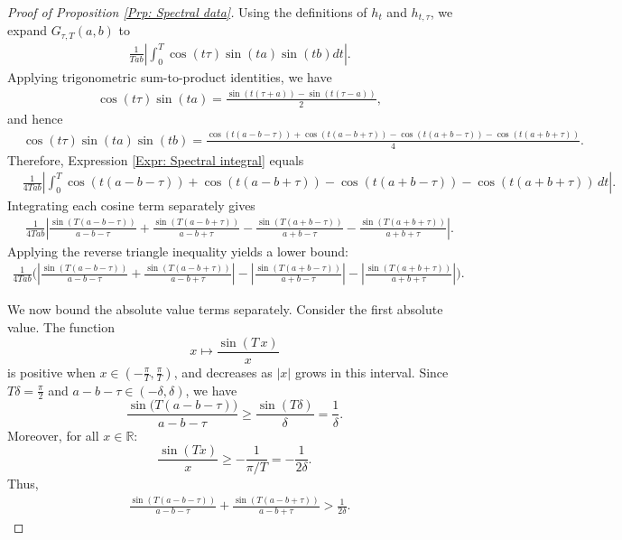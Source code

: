 \documentclass[11pt,twoside,reqno]{amsart} \usepackage{a4wide} \usepackage[T1]{fontenc} \usepackage[utf8]{inputenc} \usepackage{soul}  \usepackage{amsmath} \usepackage{amsfonts} \usepackage{amssymb} \usepackage{mathtools} \usepackage{amsthm} \usepackage{xcolor} \usepackage{graphicx} \usepackage{hyperref} \usepackage{standalone} \usepackage{esint} \usepackage{comment} \usepackage[left=2.3cm,top=3cm,right=2.3cm]{geometry} \usepackage{bm} \usepackage{svg} \usepackage{float} \numberwithin{equation}{section} \theoremstyle{plain} \newtheorem{thm}{Theorem}[section] \newtheorem{theorem}[thm]{Theorem} \newtheorem*{theorem*}{Theorem}\newtheorem{conj}[thm]{Conjecture} \newtheorem{lemma}[thm]{Lemma} \newtheorem{prop}[thm]{Proposition} \newtheorem{proposition}[thm]{Proposition} \newtheorem{cor}[thm]{Corollary} \newtheorem{question}[thm]{Question} \newtheorem{corollary}[thm]{Corollary} \newtheorem{assumption}[thm]{Assumption} \theoremstyle{definition} \newtheorem{defn}[thm]{Definition} \newtheorem{choice}[thm]{Choice} \newtheorem{definition}[thm]{Definition} \newtheorem{ex}[thm]{Example} \newtheorem{notation}[thm]{Notation} \newtheorem*{ack}{Acknowledgements} \theoremstyle{remark} \newtheorem{remark}[thm]{Remark} \newtheorem{bigremark}[thm]{Remark} \usepackage{xcolor} \newcommand{\red}[1]{ {\color{Red}#1} } \newcommand{\blue}[1]{ {\color{Blue}#1} } \author{Kai Hippi} \address{Aalto University, Espoo, Finland} \email{kai.hippi@aalto.fi}
\begin{document}
\begin{proof}[Proof of Proposition \ref{Prp: Spectral data}]
Using the definitions of $h_{t}$ and $h_{t,\tau}$, we expand $G_{\tau, T}(a,b)$ to
\begin{align}
	&
	\label{Expr: Spectral integral}
	 \frac{1}{T a b} \left| \int_{0}^{T} \cos( t \tau ) \sin( t a ) \sin( t b ) dt \right|.
\end{align}
Applying trigonometric sum-to-product identities, we have
\begin{align*}
	&
	\cos( t \tau ) \sin( t a ) = \frac{ \sin\left( t( \tau + a ) \right) - \sin \left( t (  \tau - a ) \right) }{2},
\end{align*}
and hence
\begin{align*}
	&
	\cos( t \tau ) \sin( t a ) \sin( t b ) =
	\frac{  \cos(t ( a - b - \tau ) ) + \cos( t( a - b + \tau ) ) - \cos( t( a + b - \tau ) ) - \cos( t( a + b + \tau ) ) }{4}.
\end{align*}
Therefore, Expression \eqref{Expr: Spectral integral} equals
\begin{align*}
	&
	\frac{1}{4 T a b} \left| \int_{0}^{T} \cos(t ( a - b - \tau ) ) + \cos( t( a - b + \tau ) ) - \cos( t( a + b - \tau ) ) - \cos( t( a + b + \tau ) ) \, dt \right|.
\end{align*}
Integrating each cosine term separately gives
\begin{align*}
	&
	\frac{1}{4 T a b} \left| \frac{ \sin( T( a - b - \tau ) ) }{ a - b - \tau } + \frac{ \sin( T( a - b + \tau ) ) }{a - b + \tau} - \frac{ \sin( T( a + b - \tau ) ) }{a + b - \tau} - \frac{ \sin( T( a + b + \tau ) ) }{a + b + \tau} \right|.
\end{align*}
Applying the reverse triangle inequality yields a lower bound:
\begin{align}
	\label{Expr: Reverse triangle}
\frac{1}{4Tab} \bigg(
\left| \frac{\sin(T(a - b - \tau))}{a - b - \tau}
     + \frac{\sin(T(a - b + \tau))}{a - b + \tau} \right|
-
\left| \frac{\sin(T(a + b - \tau))}{a + b - \tau} \right|
-
\left| \frac{\sin(T(a + b + \tau))}{a + b + \tau} \right|
\bigg).
\end{align}

We now bound the absolute value terms separately. Consider the first absolute value. The function
$$x \mapsto \frac{ \sin( T \, x ) }{x}$$ 
is positive when $ x \in  \left(- \frac{\pi}{T} , \frac{\pi}{T} \right)$, and decreases as $|x|$ grows in this interval. Since $T\delta = \frac{\pi}{2}$ and $a - b - \tau \in (-\delta,\delta)$, we have
$$
\frac{\sin\!\big( T(a - b - \tau) \big)}{a - b - \tau}
\geq 
\frac{\sin(T\delta)}{\delta}
= \frac{1}{\delta}.
$$
Moreover, for all $ x \in \mathbb{R} $:
$$
\frac{\sin(Tx)}{x} \ge - \frac{1}{ \pi/T } = -\frac{1}{2\delta}.
$$
Thus,
\begin{align*}
	&
	\frac{\sin(T(a - b - \tau))}{a - b - \tau}
     + \frac{\sin(T(a - b + \tau))}{a - b + \tau} > \frac{1}{2 \delta}.
\end{align*}


\end{proof}
\end{document}
